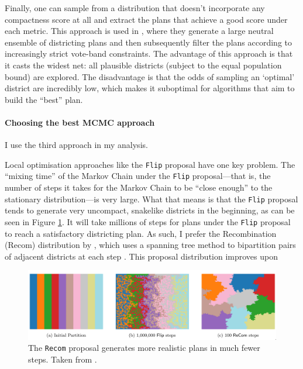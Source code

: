 \documentclass[]{article}
\let\oldparagraph\paragraph
\renewcommand{\paragraph}[1]{\oldparagraph{#1}\mbox{}}
\begin{document}
Finally, one can sample from a distribution that doesn't incorporate any
compactness score at all and extract the plans that achieve a good score
under each metric. This approach is used in \cite{ddj2019comp}, where
they generate a large neutral ensemble of districting plans and then
subsequently filter the plans according to increasingly strict vote-band
constraints. The advantage of this approach is that it casts the widest
net: all plausible districts (subject to the equal population bound) are
explored. The disadvantage is that the odds of sampling an `optimal'
district are incredibly low, which makes it suboptimal for algorithms
that aim to build the ``best'' plan.

\hypertarget{choosing-the-best-mcmc-approach}{%
\paragraph{Choosing the best MCMC
approach}\label{choosing-the-best-mcmc-approach}}

I use the third approach in my analysis.

Local optimisation approaches like the \texttt{Flip} proposal have one
key problem. The ``mixing time'' of the Markov Chain under the
\texttt{Flip} proposal---that is, the number of steps it takes for the
Markov Chain to be ``close enough'' to the stationary distribution---is
very large. What that means is that the \texttt{Flip} proposal tends to
generate very uncompact, snakelike districts in the beginning, as can be
seen in Figure \ref{recom_vs_flip}. It will take millions of steps for
plans under the \texttt{Flip} proposal to reach a satisfactory
districting plan. As such, I prefer the Recombination (Recom)
distribution by \citeauthor{ddj2019recom}, which uses a spanning tree
method to bipartition pairs of adjacent districts at each step
\citep{ddj2019comp}. This proposal distribution improves upon

\begin{figure}
\centering
\includegraphics{img/recom_vs_flip.png}
\caption{\label{recom_vs_flip} The \texttt{Recom} proposal generates
more realistic plans in much fewer steps. Taken from
\cite{ddj2019recom}.}
\end{figure}
\end{document}
